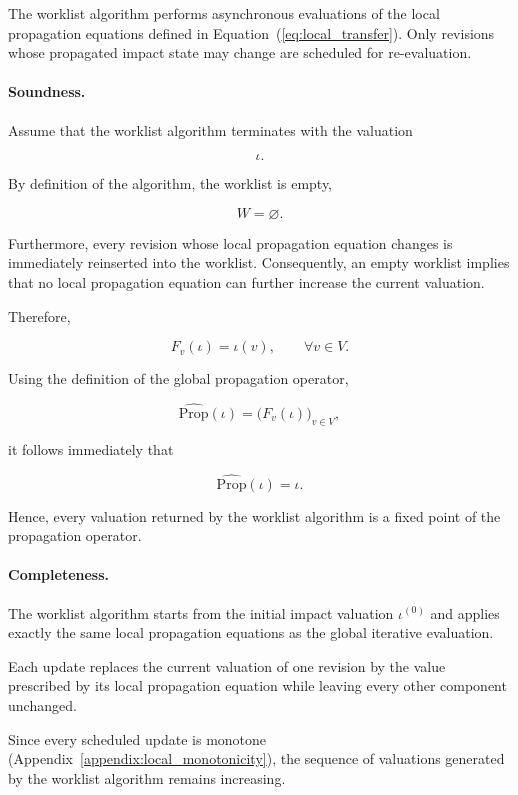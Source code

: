 \documentclass[10pt]{article}
\begin{document}
The worklist algorithm performs asynchronous evaluations of the local
propagation equations defined in
Equation~(\ref{eq:local_transfer}).
Only revisions whose propagated impact state may change are scheduled for
re-evaluation.

\paragraph{Soundness.}

Assume that the worklist algorithm terminates with the valuation

\[
\iota.
\]

By definition of the algorithm, the worklist is empty,

\[
W=\varnothing.
\]

Furthermore, every revision whose local propagation equation changes is
immediately reinserted into the worklist. Consequently, an empty worklist
implies that no local propagation equation can further increase the current
valuation.

Therefore,

\[
F_v(\iota)
=
\iota(v),
\qquad
\forall v\in V.
\]

Using the definition of the global propagation operator,

\[
\widehat{\mathrm{Prop}}(\iota)
=
\bigl(
F_v(\iota)
\bigr)_{v\in V},
\]

it follows immediately that

\begin{equation}
	\label{eq:worklist_soundness}
	\widehat{\mathrm{Prop}}(\iota)
	=
	\iota.
\end{equation}

Hence, every valuation returned by the worklist algorithm is a fixed point of
the propagation operator.

\paragraph{Completeness.}

The worklist algorithm starts from the initial impact valuation
$\iota^{(0)}$
and applies exactly the same local propagation equations as the global
iterative evaluation.

Each update replaces the current valuation of one revision by the value
prescribed by its local propagation equation while leaving every other
component unchanged.

Since every scheduled update is monotone
(Appendix~\ref{appendix:local_monotonicity}),
the sequence of valuations generated by the worklist algorithm remains
increasing.
\end{document}
